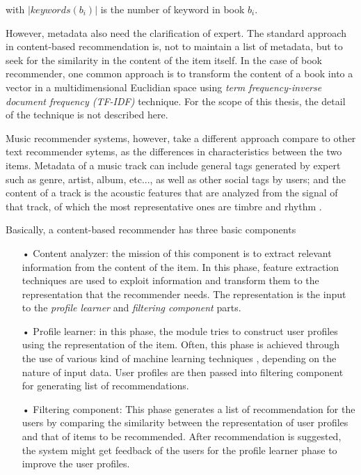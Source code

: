 with \( |keywords(b_i)| \) is the number of keyword in book \(b_i\).

However, metadata also need the clarification of expert. The standard approach in content-based recommendation is, not to maintain a list of metadata, but to seek for the similarity in the content of the item itself. In the case of book recommender, one common approach is to transform the content of a book into a vector in a multidimensional Euclidian space using \textit{term frequency-inverse document frequency (TF-IDF)} technique. For the scope of this thesis, the detail of the technique is not described here.

Music recommender systems, however, take a different approach compare to other text recommender sytems, as the differences in characteristics between the two items. Metadata of a music track can include general tags generated by expert such as genre, artist, album, etc..., as well as other social tags by users; and the content of a track is the acoustic features that are analyzed from the signal of that track, of which the most representative ones are timbre and rhythm \cite{cano2005industrial}.

Basically, a content-based recommender has three basic components \cite{ricci2011introduction} 

\begin{itemize}
\item[•] Content analyzer: the mission of this component is to extract relevant information from the  content of the item. In this phase, feature extraction techniques are used to exploit information and transform them to the representation that the recommender needs. The representation is the input to the \textit{profile learner} and \textit{filtering component} parts.

\item[•] Profile learner: in this phase, the module tries to construct user profiles using the representation of the item. Often, this phase is achieved through the use of various kind of machine learning techniques \cite{mitchell1997machine}, depending on the nature of input data. User profiles are then passed into filtering component for generating list of recommendations.

\item[•] Filtering component: This phase generates a list of recommendation for the users by comparing the similarity between the representation of user profiles and that of items to be recommended. After recommendation is suggested, the system might get feedback of the users for the profile learner phase to improve the user profiles.

\end{itemize}

